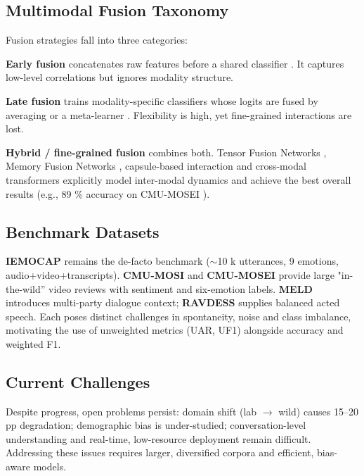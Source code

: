 \documentclass[12pt]{article}
\begin{document}
\subsection{Multimodal Fusion Taxonomy}
Fusion strategies fall into three categories:

\textbf{Early fusion} concatenates raw features before a shared
classifier \cite{poria2017review}.  It captures low-level correlations
but ignores modality structure.

\textbf{Late fusion} trains modality-specific classifiers whose logits
are fused by averaging or a meta-learner
\cite{wang2019words}.  Flexibility is high, yet fine-grained
interactions are lost.

\textbf{Hybrid / fine-grained fusion} combines both.  Tensor Fusion
Networks \cite{zadeh2018multimodal_tfn}, Memory Fusion Networks
\cite{zadeh2018mfn}, capsule-based interaction
\cite{wang2019words} and cross-modal transformers
\cite{tsai2019mult} explicitly model inter-modal dynamics and achieve
the best overall results (e.g., 89 \% accuracy on CMU-MOSEI
\cite{mittal2020m3er}).

\subsection{Benchmark Datasets}
\textbf{IEMOCAP} \cite{busso2008iemocap} remains the de-facto benchmark
($\sim$10 k utterances, 9 emotions, audio+video+transcripts).  
\textbf{CMU-MOSI} \cite{zadeh2016mosi} and
\textbf{CMU-MOSEI} \cite{zadeh2018multimodal} provide large
"in-the-wild'' video reviews with sentiment and six-emotion labels.
\textbf{MELD} \cite{poria2018meld} introduces multi-party dialogue
context; \textbf{RAVDESS} \cite{livingstone2018ravdess} supplies
balanced acted speech.  Each poses distinct challenges in spontaneity,
noise and class imbalance, motivating the use of unweighted metrics
(UAR, UF1) alongside accuracy and weighted F1.

\subsection{Current Challenges}
Despite progress, open problems persist: domain shift (lab $\rightarrow$
wild) causes 15–20 pp degradation; demographic bias is under-studied;
conversation-level understanding and real-time, low-resource deployment
remain difficult.  Addressing these issues requires larger,
diversified corpora and efficient, bias-aware models.
\end{document}

